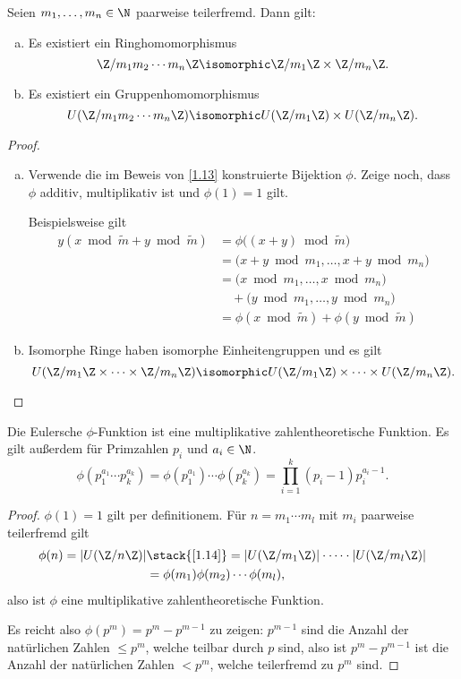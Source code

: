 \begin{st} \label{1.14}
	Seien $m_1, \dotsc, m_n \in \N$ paarweise teilerfremd.
	Dann gilt:
	\begin{enumerate}[a)]
		\item
			Es existiert ein Ringhomomorphismus
			\[
				\Z / m_1m_2 \dotsb m_n \Z
				\isomorphic
				\Z /m_1 \Z \times \Z / m_n \Z.
			\]
		\item
			Es existiert ein Gruppenhomomorphismus
			\[
				U(\Z / m_1 m_2 \dotsb m_n \Z)
				\isomorphic
				U(\Z / m_1 \Z) \times U(\Z / m_n \Z).
			\]
	\end{enumerate}
	\begin{proof}
		\begin{enumerate}[a)]
			\item
				Verwende die im Beweis von \ref{1.13} konstruierte Bijektion $\phi$.
				Zeige noch, dass $\phi$ additiv, multiplikativ ist und $\phi(1) = 1$ gilt.

				Beispielsweise gilt
				\begin{align*}
					y(x \bmod \tilde m + y \bmod \tilde m)
					&= \phi\big( (x+y) \bmod \tilde m \big) \\
					&= \big(x + y \bmod m_1, \dotsc, x + y \bmod m_n \big) \\
					&= \big( x \bmod m_1, \dotsc, x \bmod m_n\big) \\
					&\quad + \big(y \bmod m_1, \dotsc, y \bmod m_n \big) \\
					&= \phi(x \bmod \tilde m) + \phi(y \bmod \tilde m)
				\end{align*}
			\item
				Isomorphe Ringe haben isomorphe Einheitengruppen und es gilt
				\[
					U(\Z / m_1 \Z \times \dotsb \times \Z / m_n \Z)
					\isomorphic U(\Z / m_1 \Z) \times \dotsb \times U(\Z / m_n \Z).
				\]
		\end{enumerate}
	\end{proof}
\end{st}

\begin{kor} \label{1.15}
	Die Eulersche $\phi$-Funktion ist eine multiplikative zahlentheoretische Funktion.
	Es gilt außerdem für Primzahlen $p_i$ und $a_i \in \N$.
	\[
		\phi( p_1^{a_1} \dotsb p_k^{a_k} )
		=\phi( p_1^{a_1}) \dotsb \phi(p_k^{a_k})
		= \prod_{i=1}^k (p_i - 1) p_i^{a_i - 1}.
	\]
	\begin{proof}
		$\phi(1) = 1$ gilt per definitionem.
		Für $n = m_1 \dotsb m_l$ mit $m_i$ paarweise teilerfremd gilt
		\begin{align*}
			\phi(n)
			= | U(\Z / n\Z) |
			&\stack{\ref{1.14}}= |U(\Z /m _1 \Z) | \cdot \dotsb \cdot | U(\Z /m_l \Z) | \\
			&= \phi(m_1)\phi(m_2) \dotsb \phi(m_l),
		\end{align*}
		also ist $\phi$ eine multiplikative zahlentheoretische Funktion.

		Es reicht also $\phi(p^m) = p^m - p^{m-1}$ zu zeigen:
		$p^{m-1}$ sind die Anzahl der natürlichen Zahlen $\le p^m$, welche teilbar durch $p$ sind,
		also ist $p^m - p^{m-1}$ ist die Anzahl der natürlichen Zahlen $< p^m$, welche teilerfremd zu $p^m$ sind.
	\end{proof}
\end{kor}

